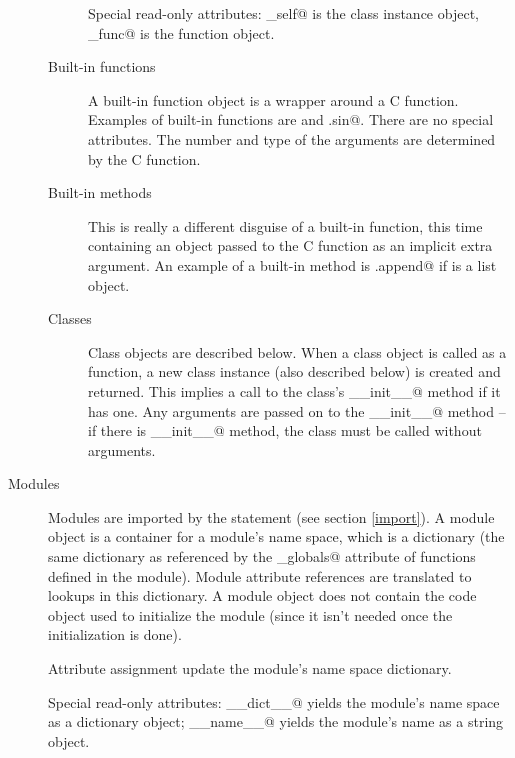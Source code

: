 \begin{description}
\begin{description}
Special read-only attributes: \verb@im_self@ is the class instance
object, \verb@im_func@ is the function object.

\item[Built-in functions]
A built-in function object is a wrapper around a C function.  Examples
of built-in functions are \verb@len@ and \verb@math.sin@.  There
are no special attributes.  The number and type of the arguments are
determined by the C function.

\item[Built-in methods]
This is really a different disguise of a built-in function, this time
containing an object passed to the C function as an implicit extra
argument.  An example of a built-in method is \verb@list.append@ if
\verb@list@ is a list object.

\item[Classes]
Class objects are described below.  When a class object is called as a
function, a new class instance (also described below) is created and
returned.  This implies a call to the class's \verb@__init__@ method
if it has one.  Any arguments are passed on to the \verb@__init__@
method -- if there is \verb@__init__@ method, the class must be called
without arguments.

\end{description}

\item[Modules]
Modules are imported by the \verb@import@ statement (see section
\ref{import}).  A module object is a container for a module's name
space, which is a dictionary (the same dictionary as referenced by the
\verb@func_globals@ attribute of functions defined in the module).
Module attribute references are translated to lookups in this
dictionary.  A module object does not contain the code object used to
initialize the module (since it isn't needed once the initialization
is done).

Attribute assignment update the module's name space dictionary.

Special read-only attributes: \verb@__dict__@ yields the module's name
space as a dictionary object; \verb@__name__@ yields the module's name
as a string object.


\end{description}
